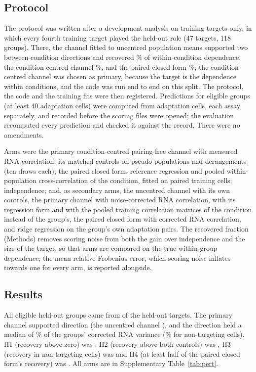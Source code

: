 \subsection*{Protocol}
The protocol was written after a development analysis on
training targets only, in which every fourth training target played the held-out
role (47 targets, 118 groups). There, the channel fitted to
uncentred population means supported two between-condition directions and
recovered \PtDevPooled\% of within-condition dependence, the condition-centred
channel \PtDevPrimary\%, and the paired closed form \PtDevPaired\%; the
condition-centred channel was chosen as primary, because the target is the dependence within
conditions, and the code was run end to end on this split. The protocol, the
code and the training fits were then registered. Predictions for
eligible groups (at least 40 adaptation cells) were computed from adaptation
cells, each assay separately, and recorded
before the scoring files were opened; the evaluation recomputed every
prediction and checked it against the record. There were no amendments.

Arms were the primary condition-centred pairing-free channel with measured RNA
correlation; its matched controls on pseudo-populations and derangements (ten
draws each); the paired closed form, reference regression and pooled
within-population cross-correlation of the condition, fitted on paired training
cells; independence; and, as secondary arms, the uncentred channel with its own
controls, the primary channel with noise-corrected RNA correlation, with its
regression form and with the pooled training correlation matrices of the
condition instead of the group's, the paired closed form with corrected RNA
correlation, and ridge regression on the group's own adaptation pairs. The
recovered fraction (Methods) removes scoring noise from both the gain over
independence and the size of the target, so that arms are compared on the true
within-group dependence; the mean relative Frobenius error, which scoring noise
inflates towards one for every arm, is reported alongside.

\subsection*{Results}
All \PtGroups{} eligible held-out groups came from \PtHeldEligible{} of the
\PtHeldTargets{} held-out targets. The primary channel supported \PtDimS{}
direction (the uncentred channel \PtDimSPooled), and the direction held a median
of \PtCoverage\% of the groups' corrected RNA variance (\PtCoverageNt\% for
non-targeting cells). H1 (recovery above zero) was \PtHOne, H2 (recovery above
both controls) was \PtHTwo, H3 (recovery in non-targeting cells) was \PtHThree{}
and H4 (at least half of the paired closed form's recovery) was \PtHFour. All arms
are in Supplementary Table~\ref{tab:pert}.

